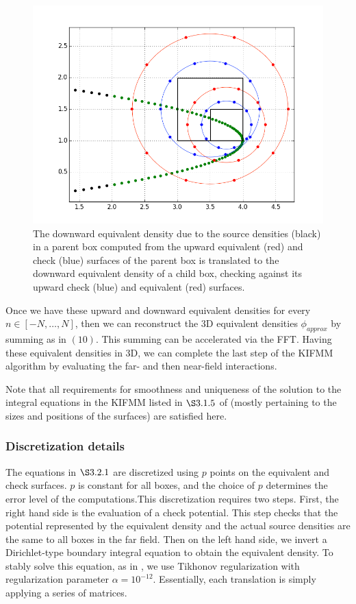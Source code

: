 \documentclass[12pt,letterpaper]{article}
\begin{document}
\begin{figure}[!ht]
\begin{center}
\includegraphics[scale=0.5]{L2L-curve}
\end{center}
\caption{The downward equivalent density due to the source densities (black) in a parent box computed from the upward equivalent (red) and check (blue) surfaces of the parent box is translated to the downward equivalent density of a child box, checking against its upward check (blue) and equivalent (red) surfaces.}
\end{figure}

Once we have these upward and downward equivalent densities for every $n\in[-N,\dots,N]$, then we can reconstruct the 3D equivalent densities $\phi_{approx}$ by summing as in $(10)$. This summing can be accelerated via the FFT. Having these equivalent densities in 3D, we can complete the last step of the KIFMM algorithm by evaluating the far- and then near-field interactions.

Note that all requirements for smoothness and uniqueness of the solution to the integral equations in the KIFMM listed in $\S3.1.5$ of \cite{YBZ} (mostly pertaining to the sizes and positions of the surfaces) are satisfied here.

\subsubsection{Discretization details}
The equations in $\S3.2.1$ are discretized using $p$ points on the equivalent and check surfaces. $p$ is constant for all boxes, and the choice of $p$ determines the error level of the computations.This discretization requires two steps. First, the right hand side is the evaluation of a check potential. This step checks that the potential represented by the equivalent density and the actual source densities are the same to all boxes in the far field. Then on the left hand side, we invert a Dirichlet-type boundary integral equation to obtain the equivalent density. To stably solve this equation, as in \cite{YBZ}, we use Tikhonov regularization with regularization parameter $\alpha=10^{-12}$. Essentially, each translation is simply applying a series of matrices.
\end{document}
